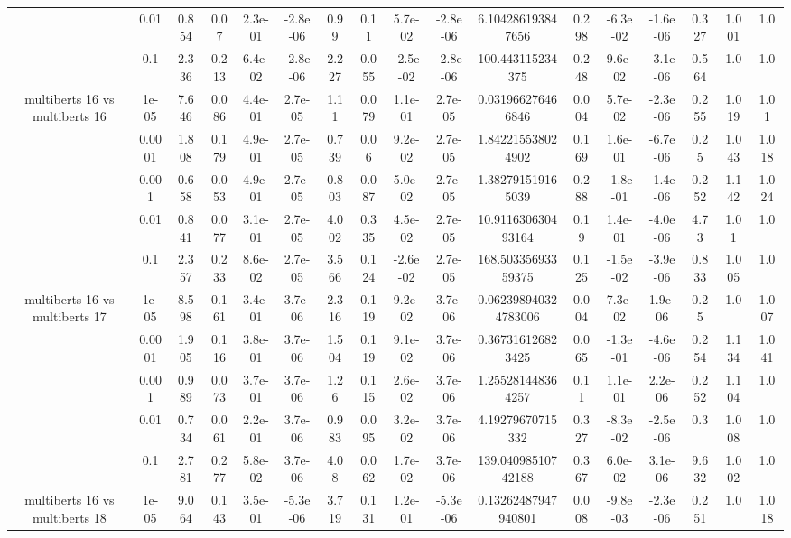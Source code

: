 \begin{tabular}{|c|c|c|c|c|c|c|c|c|c|c|c|c|c|c|c|c|}
 & 0.01 & 0.854 & 0.07 & 2.3e-01 & -2.8e-06 & 0.99 & 0.11 & 5.7e-02 & -2.8e-06 & 6.104286193847656 & 0.298 & -6.3e-02 & -1.6e-06 & 0.327 & 1.001 & 1.0 \\
 & 0.1 & 2.336 & 0.213 & 6.4e-02 & -2.8e-06 & 2.227 & 0.055 & -2.5e-02 & -2.8e-06 & 100.443115234375 & 0.248 & 9.6e-02 & -3.1e-06 & 0.564 & 1.0 & 1.0 \\
\hline
\multirow{5}{*}{multiberts 16 vs multiberts 16} & 1e-05 & 7.646 & 0.086 & 4.4e-01 & 2.7e-05 & 1.11 & 0.079 & 1.1e-01 & 2.7e-05 & 0.031966276466846 & 0.004 & 5.7e-02 & -2.3e-06 & 0.255 & 1.019 & 1.01 \\
 & 0.0001 & 1.808 & 0.179 & 4.9e-01 & 2.7e-05 & 0.739 & 0.06 & 9.2e-02 & 2.7e-05 & 1.842215538024902 & 0.169 & 1.6e-01 & -6.7e-06 & 0.25 & 1.043 & 1.018 \\
 & 0.001 & 0.658 & 0.053 & 4.9e-01 & 2.7e-05 & 0.803 & 0.087 & 5.0e-02 & 2.7e-05 & 1.382791519165039 & 0.288 & -1.8e-01 & -1.4e-06 & 0.252 & 1.142 & 1.024 \\
 & 0.01 & 0.841 & 0.077 & 3.1e-01 & 2.7e-05 & 4.002 & 0.335 & 4.5e-02 & 2.7e-05 & 10.911630630493164 & 0.19 & 1.4e-01 & -4.0e-06 & 4.73 & 1.01 & 1.0 \\
 & 0.1 & 2.357 & 0.233 & 8.6e-02 & 2.7e-05 & 3.566 & 0.124 & -2.6e-02 & 2.7e-05 & 168.50335693359375 & 0.125 & -1.5e-02 & -3.9e-06 & 0.833 & 1.005 & 1.0 \\
\hline
\multirow{5}{*}{multiberts 16 vs multiberts 17} & 1e-05 & 8.598 & 0.161 & 3.4e-01 & 3.7e-06 & 2.316 & 0.119 & 9.2e-02 & 3.7e-06 & 0.062398940324783006 & 0.004 & 7.3e-02 & 1.9e-06 & 0.25 & 1.0 & 1.007 \\
 & 0.0001 & 1.905 & 0.116 & 3.8e-01 & 3.7e-06 & 1.504 & 0.119 & 9.1e-02 & 3.7e-06 & 0.367316126823425 & 0.065 & -1.3e-01 & -4.6e-06 & 0.254 & 1.134 & 1.041 \\
 & 0.001 & 0.989 & 0.073 & 3.7e-01 & 3.7e-06 & 1.26 & 0.115 & 2.6e-02 & 3.7e-06 & 1.255281448364257 & 0.11 & 1.1e-01 & 2.2e-06 & 0.252 & 1.104 & 1.0 \\
 & 0.01 & 0.734 & 0.061 & 2.2e-01 & 3.7e-06 & 0.983 & 0.095 & 3.2e-02 & 3.7e-06 & 4.19279670715332 & 0.327 & -8.3e-02 & -2.5e-06 & 0.3 & 1.008 & 1.0 \\
 & 0.1 & 2.781 & 0.277 & 5.8e-02 & 3.7e-06 & 4.08 & 0.062 & 1.7e-02 & 3.7e-06 & 139.04098510742188 & 0.367 & 6.0e-02 & 3.1e-06 & 9.632 & 1.002 & 1.0 \\
\hline
\multirow{5}{*}{multiberts 16 vs multiberts 18} & 1e-05 & 9.064 & 0.143 & 3.5e-01 & -5.3e-06 & 3.719 & 0.131 & 1.2e-01 & -5.3e-06 & 0.13262487947940801 & 0.008 & -9.8e-03 & -2.3e-06 & 0.251 & 1.0 & 1.018 \\

\end{tabular}
